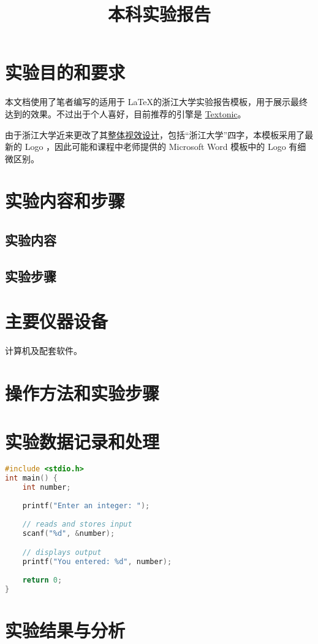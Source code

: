 \documentclass{zjureport}
\title{本科实验报告}
\date{\zhtoday}
\begin{document}
\makecover %
\makeheader

\section{实验目的和要求}
本文档使用了笔者编写的适用于 \LaTeX 的浙江大学实验报告模板，用于展示最终达到的效果。不过出于个人喜好，目前推荐的引擎是 \href{https://github.com/tectonic-typesetting/tectonic/}{Textonic}。

由于浙江大学近来更改了其\href{https://www.zju.edu.cn/572/list.htm}{整体视效设计}，包括``浙江大学''四字，本模板采用了最新的 Logo ，因此可能和课程中老师提供的 Microsoft Word 模板中的 Logo 有细微区别。

\section{实验内容和步骤}

\subsection{实验内容}

\subsection{实验步骤}

\section{主要仪器设备}
计算机及配套软件。

\section{操作方法和实验步骤}

\section{实验数据记录和处理}

\begin{lstlisting}[language=C]
#include <stdio.h>
int main() {   
    int number;
   
    printf("Enter an integer: ");  
    
    // reads and stores input
    scanf("%d", &number);

    // displays output
    printf("You entered: %d", number);
    
    return 0;
}
\end{lstlisting}

\section{实验结果与分析}
\end{document}
